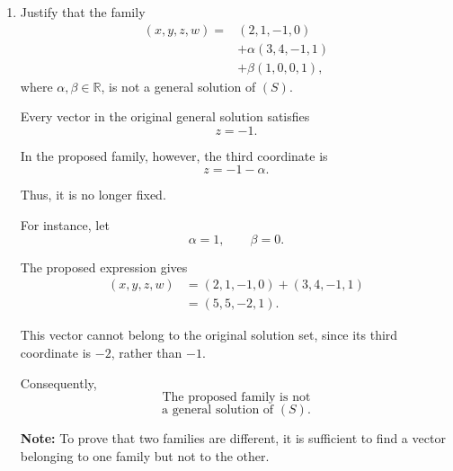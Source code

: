 \begin{enumerate}[label=\alph*)]
\item Justify that the family
$$
\begin{aligned}
(x,y,z,w)
={}&(2,1,-1,0)\\
&+\alpha(3,4,-1,1)\\
&+\beta(1,0,0,1),
\end{aligned}
$$
where $\alpha,\beta\in\mathbb{R}$,
is not a general solution of $(S)$.

\begin{answer}
    Every vector in the original general solution satisfies
    $$
    z=-1.
    $$

    In the proposed family, however, the third coordinate is
    $$
    z=-1-\alpha.
    $$

    Thus, it is no longer fixed.

    For instance, let
    $$
    \alpha=1,\qquad\beta=0.
    $$

    The proposed expression gives
    $$
    \begin{aligned}
    (x,y,z,w)
    &=(2,1,-1,0)+(3,4,-1,1)\\
    &=(5,5,-2,1).
    \end{aligned}
    $$

    This vector cannot belong to the original solution set, since its third coordinate
    is $-2$, rather than $-1$.

    Consequently,
    $$
    \boxed{
    \text{The proposed family is not}
    }
    $$
    $$
    \boxed{
    \text{a general solution of }(S).
    }
    $$

    {\color{red}
    \textbf{Note:} To prove that two families are different, it is
    sufficient to find a vector belonging to one family but not to the other.
    }
\end{answer}

\end{enumerate}
